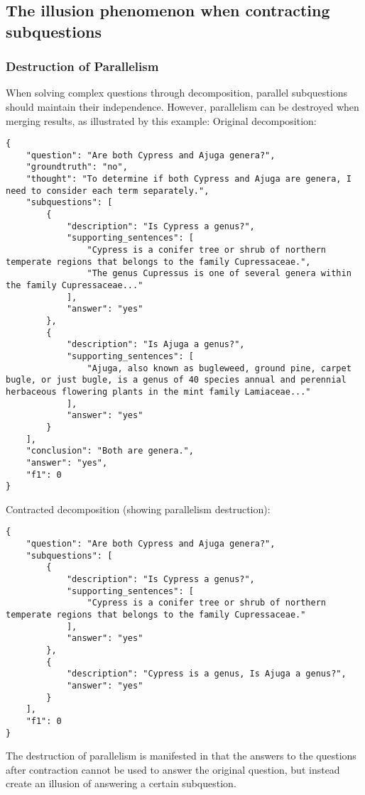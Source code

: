 \subsection{The illusion phenomenon when contracting subquestions}
\label{appendix:illusion}
\subsubsection*{Destruction of Parallelism}
When solving complex questions through decomposition, parallel subquestions should maintain their independence. However, parallelism can be destroyed when merging results, as illustrated by this example:
Original decomposition:
\begin{lstlisting}[style=PythonStyle, caption={Destruction of Parallelism Example}]
{
    "question": "Are both Cypress and Ajuga genera?",
    "groundtruth": "no",
    "thought": "To determine if both Cypress and Ajuga are genera, I need to consider each term separately.",
    "subquestions": [
        {
            "description": "Is Cypress a genus?",
            "supporting_sentences": [
                "Cypress is a conifer tree or shrub of northern temperate regions that belongs to the family Cupressaceae.",
                "The genus Cupressus is one of several genera within the family Cupressaceae..."
            ],
            "answer": "yes"
        },
        {
            "description": "Is Ajuga a genus?",
            "supporting_sentences": [
                "Ajuga, also known as bugleweed, ground pine, carpet bugle, or just bugle, is a genus of 40 species annual and perennial herbaceous flowering plants in the mint family Lamiaceae..."
            ],
            "answer": "yes"
        }
    ],
    "conclusion": "Both are genera.",
    "answer": "yes",
    "f1": 0
}
\end{lstlisting}
Contracted decomposition (showing parallelism destruction):
\begin{lstlisting}[style=PythonStyle, caption={Destruction of Parallelism Example}]
{
    "question": "Are both Cypress and Ajuga genera?",
    "subquestions": [
        {
            "description": "Is Cypress a genus?",
            "supporting_sentences": [
                "Cypress is a conifer tree or shrub of northern temperate regions that belongs to the family Cupressaceae."
            ],
            "answer": "yes"
        },
        {
            "description": "Cypress is a genus, Is Ajuga a genus?",
            "answer": "yes" 
        }
    ],
    "f1": 0
}
\end{lstlisting}
The destruction of parallelism is manifested in that the answers to the questions after contraction cannot be used to answer the original question, but instead create an illusion of answering a certain subquestion.
